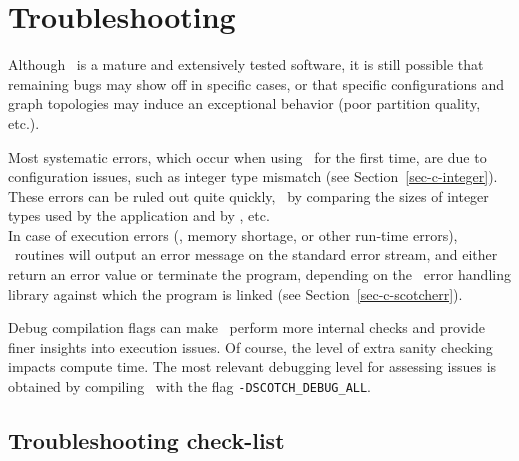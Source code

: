
\section{Troubleshooting}

Although \scotch\ is a mature and extensively tested software, it is
still possible that remaining bugs may show off in specific cases, or
that specific configurations and graph topologies may induce an
exceptional behavior (poor partition quality, etc.).

Most systematic errors, which occur when using \scotch\ for the first
time, are due to configuration issues, such as integer type mismatch
(see Section~\ref{sec-c-integer}). These errors can be ruled out quite
quickly, \eg\ by comparing the sizes of integer types used by the
application and by \scotch, etc.
\\

In case of execution errors (\eg, memory shortage, or other run-time
errors), \scotch\ routines will output an error message on the
standard error stream, and either return an error value or terminate
the program, depending on the \scotch\ error handling library against
which the program is linked (see Section~\ref{sec-c-scotcherr}).

Debug compilation flags can make \scotch\ perform more internal checks
and provide finer insights into execution issues. Of course, the level
of extra sanity checking impacts compute time. The most relevant
debugging level for assessing issues is obtained by compiling
\scotch\ with the flag \texttt{-DSCOTCH\_\lbt DEBUG\_\lbt ALL}.
\\

\subsection{Troubleshooting check-list}

